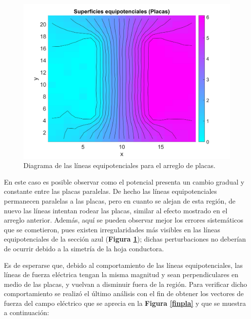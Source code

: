 \documentclass[letterpaper, 11 pt]{article}
\begin{document}
\begin{multicols}{2}
\begin{figure}[H]
   \centering
    \captionsetup{justification=centering,margin=0.5cm}
    \includegraphics[scale=0.05]{equi.jpg}
    \caption{Diagrama de las líneas equipotenciales para el arreglo de placas.}
    \label{equipla}
\end{figure}

En este caso es posible observar como el potencial presenta un cambio gradual y constante entre las placas paralelas. De hecho las líneas equipotenciales permanecen paralelas a las placas, pero en cuanto se alejan de esta región, de nuevo las líneas intentan rodear las placas, similar al efecto mostrado en el arreglo anterior. Además, aquí se pueden observar mejor los errores sistemáticos que se cometieron, pues existen irregularidades más visibles en las líneas equipotenciales de la sección azul (\textbf{Figura \ref{equipla}}); dichas perturbaciones no deberían de ocurrir debido a la simetría de la hoja conductora.

Es de esperarse que, debido al comportamiento de las líneas equipotenciales, las líneas de fuerza eléctrica tengan la misma magnitud y sean perpendiculares en medio de las placas, y vuelvan a disminuir fuera de la región. Para verificar dicho comportamiento se realizó el último análisis con el fin de obtener los vectores de fuerza del campo eléctrico que se aprecia en la  \textbf{Figura \ref{finpla}} y que se muestra a continuación:


\end{multicols}
\end{document}

